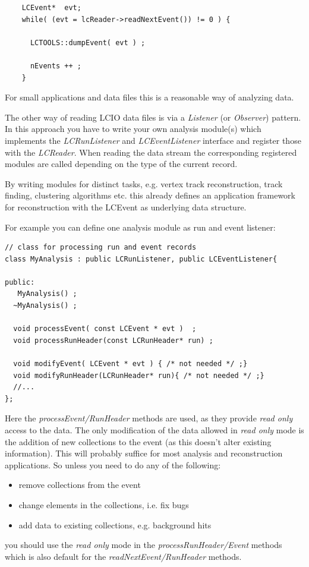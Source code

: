 \documentclass[twoside]{article}
\begin{document}
\begin{verbatim}
    LCEvent*  evt;
    while( (evt = lcReader->readNextEvent()) != 0 ) {
      
      LCTOOLS::dumpEvent( evt ) ;
      
      nEvents ++ ;
    }
\end{verbatim}

For small applications and data files this is a reasonable way of analyzing data.

The other way of reading LCIO data files is via a {\em Listener} (or {\em Observer}) pattern.
In this approach you have to write your own analysis module(s) which implements the 
{\em LCRunListener} and {\em LCEventListener} interface and register those with the {\em LCReader}.
When reading the data stream the corresponding registered modules are called depending on the type 
of the current record. 

By writing modules for distinct tasks, e.g. vertex track reconstruction, 
track finding, clustering algorithms etc. this already defines an application framework for 
reconstruction with the LCEvent as underlying data structure.

For example you can define one analysis module as run and event listener:

\begin{verbatim}
// class for processing run and event records
class MyAnalysis : public LCRunListener, public LCEventListener{
 
public:
   MyAnalysis() ;
  ~MyAnalysis() ;
 
  void processEvent( const LCEvent * evt )  ;
  void processRunHeader(const LCRunHeader* run) ;
 
  void modifyEvent( LCEvent * evt ) { /* not needed */ ;}
  void modifyRunHeader(LCRunHeader* run){ /* not needed */ ;}
  //...
};
\end{verbatim}

Here the {\em processEvent/RunHeader} methods are used, as they provide {\em read only} access to the 
data. The only modification of the data allowed in {\em read only} mode is the addition of new 
collections to the event (as this doesn't alter existing information). This will probably suffice for 
most analysis and reconstruction applications.
So unless you need to do any of the following:
\begin{itemize}
\item remove collections from the event
\item change elements in the collections, i.e. fix bugs
\item add data to existing collections, e.g. background hits
\end{itemize}
you should use the {\em read only} mode in the {\em processRunHeader/Event} methods 
which is also default for the {\em readNextEvent/RunHeader} methods.
\end{document}
